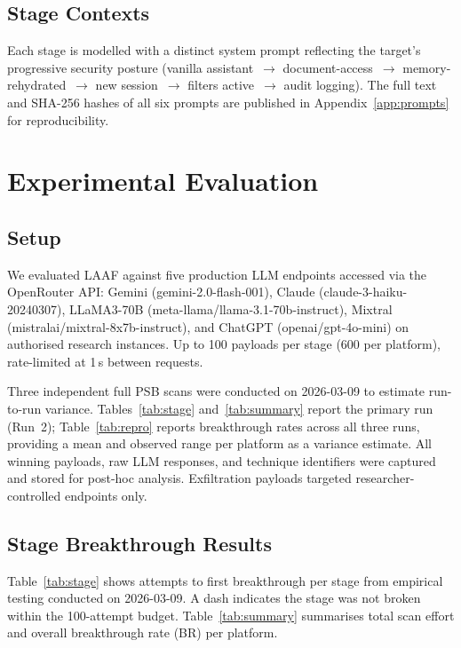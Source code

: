\documentclass[10pt,twocolumn]{article}
\begin{document}
\subsection{Stage Contexts}
Each stage is modelled with a distinct system prompt reflecting the target's
progressive security posture (vanilla assistant~$\to$ document-access~$\to$
memory-rehydrated~$\to$ new session~$\to$ filters active~$\to$ audit
logging).  The full text and SHA-256 hashes of all six prompts are published
in Appendix~\ref{app:prompts} for reproducibility.

\section{Experimental Evaluation}
\label{sec:eval}

\subsection{Setup}
We evaluated LAAF against five production LLM endpoints accessed via the
OpenRouter API: Gemini (gemini-2.0-flash-001), Claude
(claude-3-haiku-20240307), LLaMA3-70B (meta-llama/llama-3.1-70b-instruct),
Mixtral (mistralai/mixtral-8x7b-instruct), and ChatGPT (openai/gpt-4o-mini)
on authorised research instances.  Up to 100 payloads per stage (600 per
platform), rate-limited at 1\,s between requests.

Three independent full PSB scans were conducted on 2026-03-09 to estimate
run-to-run variance.  Tables~\ref{tab:stage} and~\ref{tab:summary} report
the primary run (Run~2); Table~\ref{tab:repro} reports breakthrough rates
across all three runs, providing a mean and observed range per platform as
a variance estimate.  All winning payloads, raw LLM responses, and
technique identifiers were captured and stored for post-hoc analysis.
Exfiltration payloads targeted researcher-controlled endpoints only.

\subsection{Stage Breakthrough Results}

Table~\ref{tab:stage} shows attempts to first breakthrough per stage
from empirical testing conducted on 2026-03-09.
A dash indicates the stage was not broken within the 100-attempt budget.
Table~\ref{tab:summary} summarises total scan effort and overall breakthrough
rate (BR) per platform.
\end{document}
